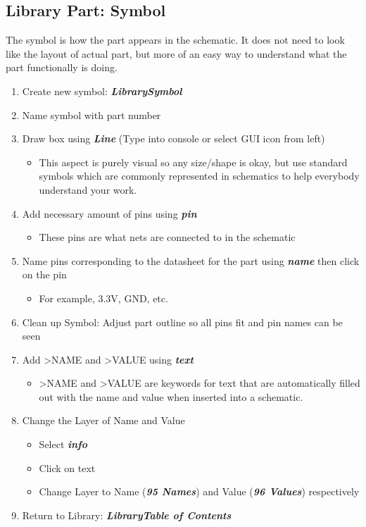 \documentclass{article}
\begin{document}
\subsection{Library Part: Symbol}
The symbol is how the part appears in the schematic. It does not need to look like the layout of actual part, but more of an easy way to understand what the part functionally is doing.
\begin{enumerate}
    \item Create new symbol: \textit{\textbf{Library\textrightarrow Symbol}}
    \item Name symbol with part number
    \item Draw box using \textit{\textbf{Line}} (Type into console or select GUI icon from left)
    \begin{itemize}
        \item This aspect is purely visual so any size/shape is okay, but use standard symbols which are commonly represented in schematics to help everybody understand your work.
    \end{itemize}
    \item Add necessary amount of pins using \textit{\textbf{pin}}
    \begin{itemize}
        \item These pins are what nets are connected to in the schematic
    \end{itemize}
    \item Name pins corresponding to the datasheet for the part using \textit{\textbf{name}} then click on the pin
    \begin{itemize}
        \item For example, 3.3V, GND, etc.
    \end{itemize}
    \item Clean up Symbol: Adjust part outline so all pins fit and pin names can be seen
    \item Add \textgreater NAME and \textgreater VALUE using \textit{\textbf{text}}
    \begin{itemize}
        \item \textgreater NAME and  \textgreater VALUE are keywords for text that are automatically filled out with the name and value when inserted into a schematic.
    \end{itemize}
    \item Change the Layer of Name and Value
    \begin{itemize}
        \item Select \textit{\textbf{info}}
        \item Click on text
        \item Change Layer to Name (\textit{\textbf{95 Names}}) and Value (\textit{\textbf{96 Values}}) respectively
    \end{itemize}  
    \item Return to Library: \textit{\textbf{Library\textrightarrow Table of Contents}}
\end{enumerate}
\end{document}
